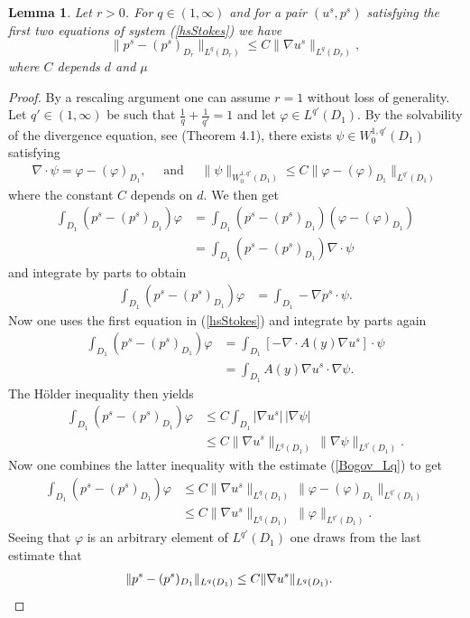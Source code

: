 \documentclass[11pt, reqno]{amsart}
\newtheorem{lemma}[theorem]{Lemma}
\theoremstyle{definition}
\theoremstyle{remark}
\numberwithin{equation}{section}
\begin{document}
\begin{appendices}
\begin{lemma} 
	Let $r>0$. For $q\in(1,\infty)$ and for a pair $(u^s,p^s)$ satisfying the first two equations of system \textup{(\ref{hsStokes})} we have \begin{equation}
		\|p^s-(p^s)_{D_r} \|_{L^q(D_r)}\leq C\|\nabla u^s \|_{L^q(D_r)},\label{estim_Bogov_p_Appendix} 
	\end{equation}where $C$ depends $d$ and $\mu$
\end{lemma}
\begin{proof}
By a rescaling argument one can assume $r=1$ without loss of generality.
Let $q'\in(1,\infty)$ be such that $\frac{1}{q}+\frac{1}{q'}=1$ and let $\varphi\in L^{q'}(D_1)$. By the solvability of the divergence equation, see \cite{Bogovskii} (Theorem 4.1), there exists $\psi\in W_0^{1,q'}(D_1)$ satisfying 
	\begin{align}
		\nabla \cdot \psi =\varphi -(\varphi)_{D_1} ,\quad \mbox{ and } \quad  \| \psi \|_{W_0^{1,q'}(D_1)} \leq C \| \varphi -(\varphi)_{D_1} \|_{L^{q'}(D_1)}\label{Bogov_Lq}
	\end{align} where the constant $C$ depends on $d.$
	We then get 
	\begin{align*}
		\int_{D_1}(p^s-(p^s)_{D_1}) \varphi & = \int_{D_1}(p^s-(p^s)_{D_1}) (\varphi -(\varphi)_{D_1})\\
		&= \int_{D_1}(p^s-(p^s)_{D_1}) \nabla \cdot \psi
	\end{align*}
	and  integrate by parts to obtain 
	\begin{align*}
		\int_{D_1}(p^s-(p^s)_{D_1}) \varphi 
		&= \int_{D_1}-\nabla p^s\cdot \psi  . 
	\end{align*}
	Now one uses the first equation in (\ref{hsStokes}) and integrate by parts again
	\begin{align*}
		\int_{D_1}(p^s-(p^s)_{D_1}) \varphi 
		&= \int_{D_1}[- \nabla\cdot A (y)  \nabla u^s ]\cdot \psi  \\  
		&= \int_{D_1} A (y)  \nabla u^s \cdot \nabla  \psi  .  
	\end{align*}
	The H\"older  inequality then yields 
	\begin{align*}
		\int_{D_1}(p^s-(p^s)_{D_1}) \varphi 
		&\leq  C \int_{D_1}  | \nabla u^s |\, |\nabla  \psi | \\
		&\leq  C  \| \nabla u^s \|_{L^q(D_1)} \, \|\nabla  \psi \|_{L^{q'}(D_1)}.
	\end{align*}
	Now one combines the latter inequality with the estimate (\ref{Bogov_Lq}) to get
	\begin{align*}
		\int_{D_1}(p^s-(p^s)_{D_1}) \varphi 
		&\leq  C  \| \nabla u^s \|_{L^q(D_1)} \, \| \varphi -(\varphi)_{D_1} \|_{L^{q'}(D_1)}\\
		&\leq  C  \| \nabla u^s \|_{L^q(D_1)} \,  \| \varphi  \|_{L^{q'}(D_1)}.
	\end{align*}
	Seeing that $\varphi$ is an arbitrary element of $L^{q'}(D_1)$ one draws from the last estimate  that 
	\begin{align}
		\|p^s-(p^s)_{D_1} \|_{L^q(D_1)} 
		&\leq  C  \| \nabla u^s \|_{L^q(D_1)}.\label{Bogov_D_1}\qedhere
	\end{align}


\end{proof}
\end{appendices}
\end{document}
